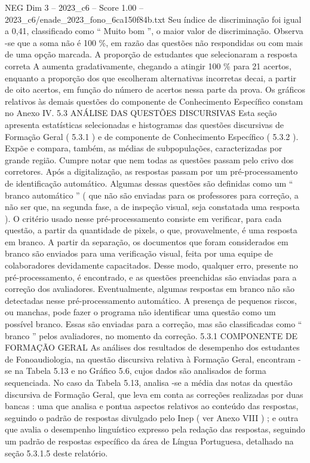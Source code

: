 \begin{textsample}{NEG Dim 3 – 2023\_c6 – Score 1.00 – 2023\_c6/enade\_2023\_fono\_6ca150f84b.txt}
Seu índice de discriminação foi igual a 0,41, classificado como “ Muito bom ”, o maior valor de discriminação.
Observa -se que a soma não é 100 \%, em razão das questões não respondidas ou com mais de uma opção marcada.
A proporção de estudantes que selecionaram a resposta correta A aumenta gradativamente, chegando a atingir 100 \% para 21 acertos, enquanto a proporção dos que escolheram alternativas incorretas decai, a partir de oito acertos, em função do número de acertos nessa parte da prova.
Os gráficos relativos às demais questões do componente de Conhecimento Específico constam no Anexo IV. 5.3 ANÁLISE DAS QUESTÕES DISCURSIVAS Esta seção apresenta estatísticas selecionadas e histogramas das questões discursivas de Formação Geral ( 5.3.1 ) e de componente de Conhecimento Específico ( 5.3.2 ).
Expõe e compara, também, as médias de subpopulações, caracterizadas por grande região.
Cumpre notar que nem todas as questões passam pelo crivo dos corretores.
Após a digitalização, as respostas passam por um pré-processamento de identificação automático.
Algumas dessas questões são definidas como um “ branco automático ” ( que não são enviadas para os professores para correção, a não ser que, na segunda fase, a de inspeção visual, seja constatada uma resposta ).
O critério usado nesse pré-processamento consiste em verificar, para cada questão, a partir da quantidade de pixels, o que, provavelmente, é uma resposta em branco.
A partir da separação, os documentos que foram considerados em branco são enviados para uma verificação visual, feita por uma equipe de colaboradores devidamente capacitados.
Desse modo, qualquer erro, presente no pré-processamento, é encontrado, e as questões preenchidas são enviadas para a correção dos avaliadores.
Eventualmente, algumas respostas em branco não são detectadas nesse pré-processamento automático.
A presença de pequenos riscos, ou manchas, pode fazer o programa não identificar uma questão como um possível branco.
Essas são enviadas para a correção, mas são classificadas como “ branco ” pelos avaliadores, no momento da correção. 5.3.1 COMPONENTE DE FORMAÇÃO GERAL As análises dos resultados de desempenho dos estudantes de Fonoaudiologia, na questão discursiva relativa à Formação Geral, encontram -se na Tabela 5.13 e no Gráfico 5.6, cujos dados são analisados de forma sequenciada.
No caso da Tabela 5.13, analisa -se a média das notas da questão discursiva de Formação Geral, que leva em conta as correções realizadas por duas bancas : uma que analisa e pontua aspectos relativos ao conteúdo das respostas, seguindo o padrão de respostas divulgado pelo Inep ( ver Anexo VIII ) ; e outra que avalia o desempenho linguístico expresso pela redação das respostas, seguindo um padrão de respostas específico da área de Língua Portuguesa, detalhado na seção 5.3.1.5 deste relatório.

\end{textsample}
